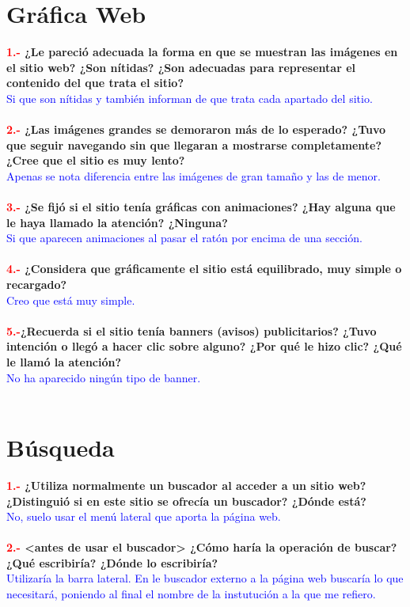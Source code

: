 \documentclass[openany,overnay,a4paper, twoside, 14pt]{book}
\begin{document}
\chapter*{Gráfica Web}
\textbf{\textcolor{red}{1.-} ¿Le pareció adecuada la forma en que se muestran las imágenes en el sitio web? ¿Son nítidas? ¿Son adecuadas para representar el contenido del que trata el sitio?}\\
\textcolor{blue}{Si que son nítidas y también informan de que trata cada apartado del sitio.}\\
\\
\textbf{\textcolor{red}{2.-} ¿Las imágenes grandes se demoraron más de lo esperado? ¿Tuvo que seguir navegando sin que llegaran a mostrarse completamente? ¿Cree que el sitio es muy lento?}\\
\textcolor{blue}{Apenas se nota diferencia entre las imágenes de gran tamaño y las de menor.}\\
\\
\textbf{\textcolor{red}{3.-} ¿Se fijó si el sitio tenía gráficas con animaciones? ¿Hay alguna que le haya llamado la
atención? ¿Ninguna?}\\
\textcolor{blue}{Si que aparecen animaciones al pasar el ratón por encima de una sección.}\\
\\
\textbf{\textcolor{red}{4.-} ¿Considera que gráficamente el sitio está equilibrado, muy simple o recargado?}\\
\textcolor{blue}{Creo que está muy simple.}\\
\\
\textbf{\textcolor{red}{5.-}¿Recuerda si el sitio tenía banners (avisos) publicitarios? ¿Tuvo intención o llegó a hacer clic sobre alguno? ¿Por qué le hizo clic? ¿Qué le llamó la atención? }\\
\textcolor{blue}{No ha aparecido ningún tipo de banner.}\\
\\
\chapter*{Búsqueda}
\textbf{\textcolor{red}{1.-} ¿Utiliza normalmente un buscador al acceder a un sitio web? ¿Distinguió si en este sitio se ofrecía un buscador? ¿Dónde está?}\\
\textcolor{blue}{No, suelo usar el menú lateral que aporta la página web.}\\
\\
\textbf{\textcolor{red}{2.-} <antes de usar el buscador> ¿Cómo haría la operación de buscar? ¿Qué escribiría? ¿Dónde lo escribiría?}\\
\textcolor{blue}{Utilizaría la barra lateral. En le buscador externo a la página web buscaría lo que necesitará, poniendo al final el nombre de la instutución a la que me refiero.}\\
\\
\end{document}
